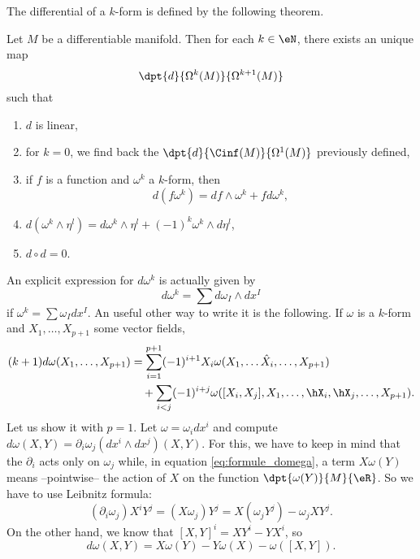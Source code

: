 The differential of a $k$-form is defined by the following theorem.

\begin{theorem}
Let $M$ be a differentiable manifold. Then for each $k\in \eN$, there exists an unique map
\[
  \dpt{d}{\Omega^k(M)}{\Omega^{k+1}(M)}
\]
such that

\begin{enumerate}
\item $d$ is linear,
\item for $k=0$, we find back the $\dpt{d}{\Cinf(M)}{\Omega^1(M)}$ previously defined,
\item if $f$ is a function and $\omega^k$ a $k$-form, then
\begin{equation}
d(f\omega^k)=df\wedge\omega^k+fd\omega^k,
\end{equation}


\item $d(\omega^k\wedge\eta^l)=d\omega^k\wedge\eta^l+(-1)^k\omega^k\wedge d\eta^l$,
\item $d\circ d=0$.
\end{enumerate}
\end{theorem}

An explicit expression for $d\omega^k$ is actually given by
\begin{equation}
   d\omega^k=\sum d\omega_I\wedge dx^I
\end{equation}
if $\omega^k=\sum\omega_I dx^I$.
An useful other way to write it is the following. If $\omega$ is a $k$-form and $X_1,\ldots,X_{p+1}$ some vector fields,
\begin{equation}\label{eq:formule_domega}
\begin{split}
  (k+1)d\omega(X_1,\ldots,X_{p+1})&=\sum_{i=1}^{p+1}(-1)^{i+1}X_i\omega(X_1,\ldots\hat{X}_i,\ldots,X_{p+1})\\
                                  &\quad+\sum_{i<j}(-1)^{i+j}\omega([X_i,X_j],X_1,\ldots,\hX_i,\hX_j,\ldots,X_{p+1}).
\end{split}
\end{equation}
Let us show it with $p=1$. Let $\omega=\omega_i dx^i$ and compute $d\omega(X,Y)=\partial_i\omega_j(dx^i\wedge dx^j)(X,Y)$. For this, we have to keep in mind that the $\partial_i$ acts only on $\omega_j$ while, in equation \eqref{eq:formule_domega}, a term $X\omega(Y)$ means --pointwise-- the action of $X$ on the function $\dpt{\omega(Y)}{M}{\eR}$. So we have to use Leibnitz formula:
\[
  (\partial_i\omega_j)X^iY^j=(X\omega_j)Y^j
                            =X(\omega_j Y^j)-\omega_j XY^j.
\]
On the other hand, we know that $[X,Y]^i=XY^i-YX^i$, so
\begin{equation}
   d\omega(X,Y)=X\omega(Y)-Y\omega(X)-\omega([X,Y]).
\end{equation}

